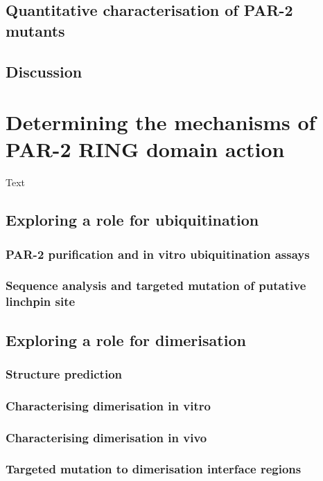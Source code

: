 \documentclass[12pt]{"article"}
\begin{document}
\clearpage
\subsection{Quantitative characterisation of PAR-2 mutants}

\subsection{Discussion}

\clearpage
\section{Determining the mechanisms of PAR-2 RING domain action}

Text

\subsection{Exploring a role for ubiquitination}
\subsubsection{PAR-2 purification and in vitro ubiquitination assays}
\subsubsection{Sequence analysis and targeted mutation of putative linchpin site}

\subsection{Exploring a role for dimerisation}
\subsubsection{Structure prediction}
\subsubsection{Characterising dimerisation in vitro}
\subsubsection{Characterising dimerisation in vivo}
\subsubsection{Targeted mutation to dimerisation interface regions}
\end{document}
